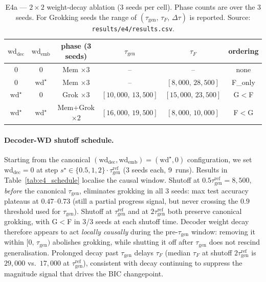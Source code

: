 \documentclass{article}
\newcommand{\taug}{\tau_{\mathrm{gen}}}
\newcommand{\tauf}{\tau_{F}}
\newcommand{\Dtau}{\Delta\tau}
\begin{document}
\begin{table}[tbp]
  \centering
  \caption{E4a --- $2{\times}2$ weight-decay ablation (3 seeds per
    cell).
    Phase counts are over the 3 seeds.
    For Grokking seeds the range of
    $(\taug,\,\tauf,\,\Dtau)$ is reported.
    Source: \texttt{results/e4/results.csv}.}
  \label{tab:e4_2x2}
  \small
  \begin{tabular}{cccccc}
    \toprule
    $\mathrm{wd}_{\mathrm{dec}}$ & $\mathrm{wd}_{\mathrm{emb}}$ &
    phase (3 seeds) & $\taug$ & $\tauf$ & ordering \\
    \midrule
    $0$              & $0$              & Mem $\times 3$              & --                & --                  & none \\
    $0$              & $\mathrm{wd}^{\star}$ & Mem $\times 3$         & --                & $[8{,}000,\,28{,}500]$ & F\_only \\
    $\mathrm{wd}^{\star}$ & $0$         & Grok $\times 3$             & $[10{,}000,\,13{,}500]$ & $[15{,}000,\,23{,}500]$ & G$<$F \\
    $\mathrm{wd}^{\star}$ & $\mathrm{wd}^{\star}$ & Mem+Grok$\times 2$ & $[16{,}000,\,19{,}500]$ & $[8{,}000,\,10{,}000]$ & F$<$G \\
    \bottomrule
  \end{tabular}
\end{table}

\paragraph{Decoder-WD shutoff schedule.}
Starting from the canonical
$(\mathrm{wd}_{\mathrm{dec}},\mathrm{wd}_{\mathrm{emb}})
{=}(\mathrm{wd}^{\star},0)$ configuration, we set
$\mathrm{wd}_{\mathrm{dec}}{=}0$ at step
$s^{\star}\in\{0.5,1,2\}\cdot\taug^{\mathrm{ref}}$
(3 seeds each, 9~runs).
Results in Table~\ref{tab:e4_schedule} localise the causal window.
Shutoff at $0.5\taug^{\mathrm{ref}}{=}8{,}500$, \emph{before} the
canonical $\taug$, eliminates grokking in all 3 seeds: max test
accuracy plateaus at $0.47$--$0.73$ (still a partial progress
signal, but never crossing the $0.9$ threshold used for $\taug$).
Shutoff at $\taug^{\mathrm{ref}}$ and at $2\taug^{\mathrm{ref}}$
both preserve canonical grokking, with G$<$F in 3/3 seeds at each
shutoff time.
Decoder weight decay therefore appears to act \emph{locally
causally} during the pre-$\taug$ window: removing it within
$[0,\,\taug)$ abolishes grokking, while shutting it off after
$\taug$ does not rescind generalisation. Prolonged
decay past $\taug$ delays $\tauf$ (median $\tauf$ at shutoff
$2\taug^{\mathrm{ref}}$ is $29{,}000$ vs.\ $17{,}000$ at
$\taug^{\mathrm{ref}}$), consistent with decay continuing to
suppress the magnitude signal that drives the BIC changepoint.
\end{document}
